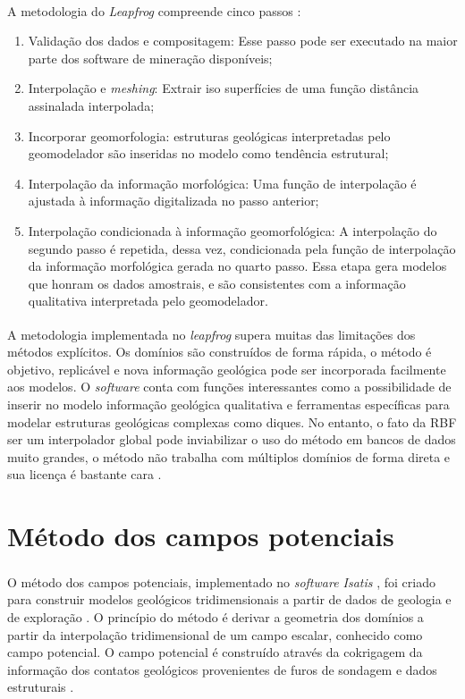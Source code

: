 A metodologia do \textit{Leapfrog}\textsuperscript{\textregistered} compreende cinco passos \cite{cowan2002rapid}:
\begin{enumerate}
\item Validação dos dados e compositagem: Esse passo pode ser executado na maior parte dos software de mineração disponíveis;
\item Interpolação e \textit{meshing}: Extrair iso superfícies de uma função distância assinalada interpolada;
\item Incorporar geomorfologia: estruturas geológicas interpretadas pelo geomodelador são inseridas no modelo como tendência estrutural;
\item Interpolação da informação morfológica: Uma função de interpolação é ajustada à informação digitalizada no passo anterior;
\item Interpolação condicionada à informação geomorfológica: A interpolação do segundo passo é repetida, dessa vez, condicionada pela função de interpolação da informação morfológica gerada no quarto passo. Essa etapa gera modelos que honram os dados amostrais, e são consistentes com a informação qualitativa interpretada pelo geomodelador.
\end{enumerate}

A metodologia implementada no \textit{leapfrog}\textsuperscript{\textregistered} supera muitas das limitações dos métodos explícitos. Os domínios são construídos de forma rápida, o método é objetivo, replicável e nova informação geológica pode ser incorporada facilmente aos modelos. O \textit{software} conta com funções interessantes como a possibilidade de inserir no modelo informação geológica qualitativa e ferramentas específicas para modelar estruturas geológicas complexas como diques. No entanto, o fato da RBF ser um interpolador global pode inviabilizar o uso do método em bancos de dados muito grandes, o método não trabalha com múltiplos domínios de forma direta e sua licença é bastante cara \cite{mclennan2006implicit}.

\section{Método dos campos potenciais}\label{sec_campos}

O método dos campos potenciais, implementado no \textit{software Isatis} \textsuperscript{\textregistered}, foi criado para construir modelos geológicos tridimensionais a partir de dados de geologia e de exploração \cite{chiles2004modelling}. O princípio do método é derivar a geometria dos domínios a partir da interpolação tridimensional de um campo escalar, conhecido como campo potencial. O campo potencial é construído através da cokrigagem da informação dos contatos geológicos provenientes de furos de sondagem e dados estruturais \cite{renard2013modeling}.

